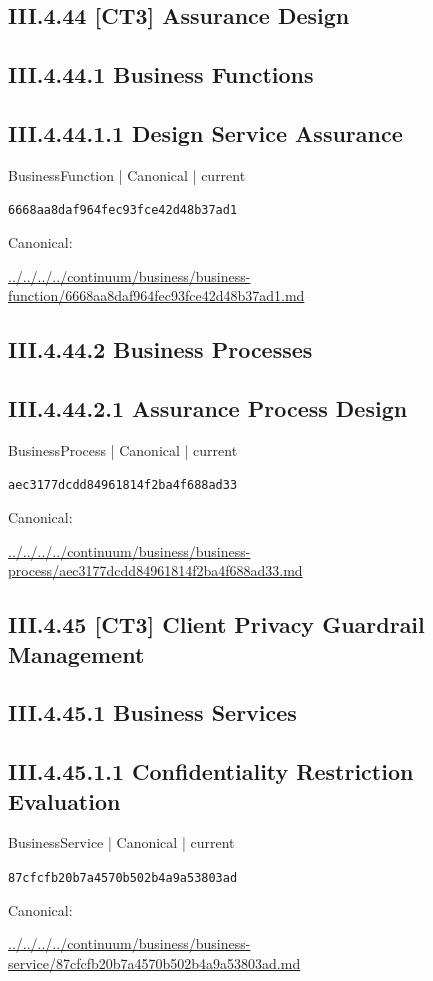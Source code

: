 \documentclass[10pt,a4paper]{article}
\begin{document}
\subsection*{III.4.44 [CT3] Assurance Design}
\subsection*{III.4.44.1 Business Functions}
\subsection*{III.4.44.1.1 Design Service Assurance}
{\small BusinessFunction | Canonical | current}\par
\texttt{6668aa8daf964fec93fce42d48b37ad1}\par
Canonical: \par
{\footnotesize\url{../../../../continuum/business/business-function/6668aa8daf964fec93fce42d48b37ad1.md}}\par
\subsection*{III.4.44.2 Business Processes}
\subsection*{III.4.44.2.1 Assurance Process Design}
{\small BusinessProcess | Canonical | current}\par
\texttt{aec3177dcdd84961814f2ba4f688ad33}\par
Canonical: \par
{\footnotesize\url{../../../../continuum/business/business-process/aec3177dcdd84961814f2ba4f688ad33.md}}\par
\subsection*{III.4.45 [CT3] Client Privacy Guardrail Management}
\subsection*{III.4.45.1 Business Services}
\subsection*{III.4.45.1.1 Confidentiality Restriction Evaluation}
{\small BusinessService | Canonical | current}\par
\texttt{87cfcfb20b7a4570b502b4a9a53803ad}\par
Canonical: \par
{\footnotesize\url{../../../../continuum/business/business-service/87cfcfb20b7a4570b502b4a9a53803ad.md}}\par
\end{document}
